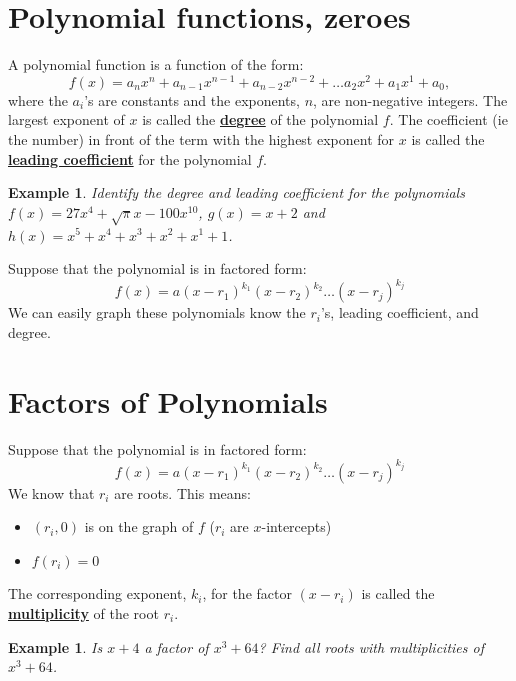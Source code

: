 \documentclass[twoside]{tufte-handout}
\newcommand{\booksection}{0}
\newcommand{\pageheader}{}
\newcounter{ekcounter}%
\theoremstyle{ekimcustom}
\newtheorem{exm}[ekcounter]{Example}
\begin{document}
\renewcommand{\booksection}{Polynomial functions, zeroes}
\renewcommand{\pageheader}{\booksection }
\section*{\LARGE \pageheader}


A polynomial function is a function of the form: $$f(x)=a_nx^n+a_{n-1}x^{n-1}+a_{n-2}x^{n-2}+\dots a_2x^2+a_1x^1+a_0,$$ where the $a_i$'s are constants and the exponents, $n$, are non-negative integers. The largest exponent of $x$ is called the \underline{\bf degree} of the polynomial $f$. 
The coefficient (ie the number) in front of the term with the highest exponent for $x$ is called the  \underline{\bf leading coefficient} for the polynomial $f$.  


\everymath{\displaystyle}
\begin{exm}{}Identify the degree and leading coefficient for the polynomials $f(x)=27x^4+\sqrt{\pi}x-100x^{10}$, $g(x)=x+2$ and $h(x)=x^5+x^4+x^3+x^2+x^1+1$.
\end{exm}\vspace{6cm}

Suppose that the polynomial is in factored form: $$f(x)=a(x-r_1)^{k_1}(x-r_2)^{k_2}\dots(x-r_j)^{k_j}$$
We can easily graph these polynomials know the $r_i$'s, leading coefficient, and degree.

\section{Factors of Polynomials}
 Suppose that the polynomial is in factored form: $$f(x)=a(x-r_1)^{k_1}(x-r_2)^{k_2}\dots(x-r_j)^{k_j}$$  We know that $r_i$ are roots. This means:     \begin{itemize}
	\item $(r_i,0)$ is on the graph of $f$ ($r_i$ are $x$-intercepts)   
	\item  $f(r_i)=0$  
\end{itemize}
The corresponding exponent, $k_i$, for the factor $(x-r_i)$ is called the \underline{\bf multiplicity} of the root $r_i$.  

\everymath{\displaystyle}
\begin{exm}{Is $x+4$ a factor of $x^3+64$? Find all roots with multiplicities of $x^3+64$.}
\end{exm}\vskip10pt
\end{document}
